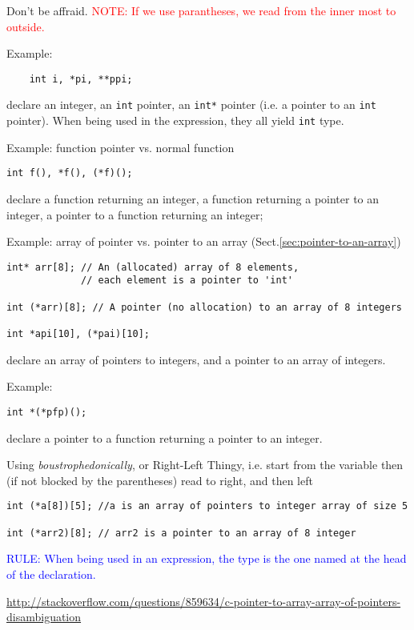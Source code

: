 \begin{mdframed}
Don't be affraid. \textcolor{red}{NOTE: If we use parantheses, we read from the
inner most to outside.}
\end{mdframed}

Example:
\begin{lstlisting}
    int i, *pi, **ppi;
\end{lstlisting}
declare an integer, an \verb!int! pointer, an \verb!int*! pointer (i.e. a
pointer to an \verb!int! pointer). When being used in the expression, they all
yield \verb!int! type.

Example: function pointer vs. normal function
\begin{lstlisting}
int f(), *f(), (*f)();
\end{lstlisting}
declare a function returning an integer, a function returning a pointer to an
integer, a pointer to a function returning an integer; 

Example: array of pointer vs. pointer to an array (Sect.\ref{sec:pointer-to-an-array})
\begin{verbatim}
int* arr[8]; // An (allocated) array of 8 elements, 
             // each element is a pointer to 'int'

int (*arr)[8]; // A pointer (no allocation) to an array of 8 integers

int *api[10], (*pai)[10];
\end{verbatim}
declare an array of pointers to integers, and a pointer to an array of integers.

Example:
\begin{verbatim}
int *(*pfp)();
\end{verbatim}
declare a pointer to a function returning a pointer to an integer. 

Using {\it boustrophedonically}, or Right-Left Thingy, i.e. start from the
variable then (if not blocked by the parentheses) read to right, and then left
\begin{verbatim}
int (*a[8])[5]; //a is an array of pointers to integer array of size 5

int (*arr2)[8]; // arr2 is a pointer to an array of 8 integer 
\end{verbatim}

\textcolor{blue}{RULE: When being used in an expression, the type is the one
named at the head of the declaration.} 

\url{http://stackoverflow.com/questions/859634/c-pointer-to-array-array-of-pointers-disambiguation}

